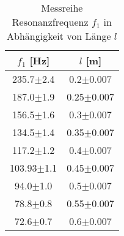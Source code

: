 \begin{table}[H]
    \centering
		\caption{Messreihe Resonanzfrequenz $ f_{1} $ in Abhängigkeit von Länge $ l $}
		\begin{tabular}{|c|c|}
			\hline
			$ f_{1} $ [Hz] & $ l $ [m] \\
			\hline
			235.7$ \pm $2.4& 0.2$ \pm $0.007 \\
			\hline
			187.0$ \pm $1.9& 0.25$ \pm $0.007 \\
			\hline
			156.5$ \pm $1.6& 0.3$ \pm $0.007 \\
			\hline
			134.5$ \pm $1.4& 0.35$ \pm $0.007 \\
			\hline
			117.2$ \pm $1.2& 0.4$ \pm $0.007 \\
			\hline
			103.93$ \pm $1.1& 0.45$ \pm $0.007 \\
			\hline
			94.0$ \pm $1.0& 0.5$ \pm $0.007 \\
			\hline
			78.8$ \pm $0.8& 0.55$ \pm $0.007 \\
			\hline
			72.6$ \pm $0.7& 0.6$ \pm $0.007 \\
			\hline
		\end{tabular}
	\label{tab: l}
\end{table}
